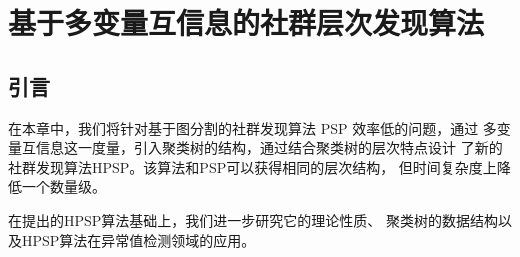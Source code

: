 
\chapter{基于多变量互信息的社群层次发现算法}\label{chap:info_clustering}
\section{引言}
在本章中，我们将针对基于图分割的社群发现算法 PSP 效率低的问题，通过
多变量互信息这一度量，引入聚类树的结构，通过结合聚类树的层次特点设计
了新的社群发现算法HPSP。该算法和PSP可以获得相同的层次结构，
但时间复杂度上降低一个数量级。

在提出的HPSP算法基础上，我们进一步研究它的理论性质、
聚类树的数据结构以及HPSP算法在异常值检测领域的应用。

